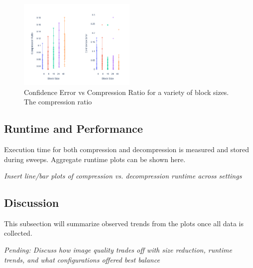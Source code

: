 \begin{figure}
    \label{fig:block_size_sweep}
    \includegraphics[width=0.5\textwidth]{assets/Confidence Err Vs Block Size.png}
    \caption{Confidence Error vs Compression Ratio for a variety of block sizes. The compression ratio }
\end{figure}
\subsection{Runtime and Performance}
Execution time for both compression and decompression is measured and stored during sweeps. Aggregate runtime plots can be shown here.

\textit{Insert line/bar plots of compression vs. decompression runtime across settings}

\subsection{Discussion}
This subsection will summarize observed trends from the plots once all data is collected.

\textit{Pending: Discuss how image quality trades off with size reduction, runtime trends, and what configurations offered best balance}